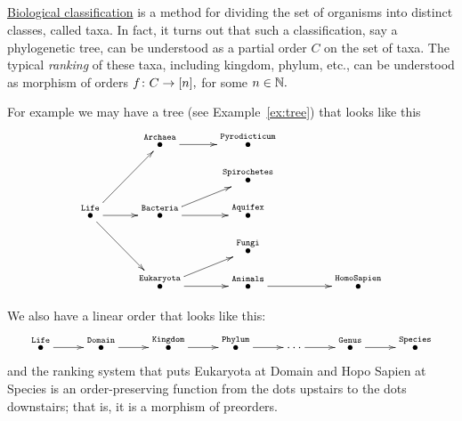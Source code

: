 \documentclass[../main/CT4S-EN-RU]{subfiles}
\begin{document}
\begin{exerciseRUS}
\end{exerciseRUS}


\subsection{}


\subsubsection{}

\begin{blockENG}
\href{http://en.wikipedia.org/wiki/Biological_classification}{\text Biological classification} is a method for dividing the set of organisms into distinct classes, called taxa. In fact, it turns out that such a classification, say a phylogenetic tree, can be understood as a partial order $C$ on the set of taxa. The typical {\em ranking} of these taxa, including kingdom, phylum, etc., can be understood as morphism of orders $f\colon C\rightarrow [n],$ for some $n\in{\mathbb N}.$ 
\end{blockENG}

\begin{blockRUS}
\end{blockRUS}

\begin{blockENG}
For example we may have a tree (see Example~\ref{ex:tree}) that looks like this 
$$
\xymatrix@=10pt{
&&\LTO{Archaea}\ar[rr]&&\LTO{Pyrodicticum}\\
&&&&\LTO{Spirochetes}\\
\LTO{Life}\ar[rr]\ar[ddrr]\ar[uurr]&&\LTO{Bacteria}\ar[rr]\ar[rru]&&\LTO{Aquifex}\\
&&&&\LTO{Fungi}\\
&&\LTO{Eukaryota}\ar[rr]\ar[urr]&&\LTO{Animals}\ar[rrr]&&&\LTO{Homo Sapien}}
$$
\end{blockENG}

\begin{blockRUS}
\end{blockRUS}

\begin{blockENG}
We also have a linear order that looks like this:
$$
\xymatrix{\LTO{Life}\ar[r]&\LTO{Domain}\ar[r]&\LTO{Kingdom}\ar[r]&\LTO{Phylum}\ar[r]&\cdots\ar[r]&\LTO{Genus}\ar[r]&\LTO{Species}}
$$
and the ranking system that puts Eukaryota at Domain and Hopo Sapien at Species is an order-preserving function from the dots upstairs to the dots downstairs; that is, it is a morphism of preorders.
\end{blockENG}
\end{document}
